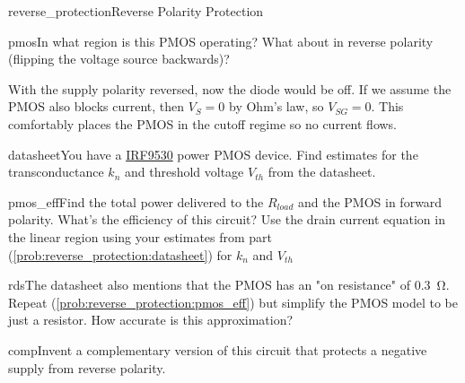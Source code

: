 \begin{mainquestion}{reverse_protection}{Reverse Polarity Protection}
\begin{partquestion}{pmos}{In what region is this PMOS operating? What about in reverse polarity (flipping the voltage source backwards)?}
\begin{answer}
    With the supply polarity reversed, now the diode would be off. If we assume the PMOS also blocks current, then $V_{S} = 0$ by Ohm's law, so $V_{SG} = 0$. This comfortably places the PMOS in the cutoff regime so no current flows.
\end{answer}
\end{partquestion}

\begin{partquestion}{datasheet}{You have a \href{https://www.vishay.com/docs/91076/91076.pdf}{IRF9530} power PMOS device. Find estimates for the transconductance $k_n$ and threshold voltage $V_{th}$ from the datasheet.}
\end{partquestion}

\begin{partquestion}{pmos_eff}{Find the total power delivered to the $R_{load}$ and the PMOS in forward polarity. What's the efficiency of this circuit? Use the drain current equation in the linear region using your estimates from part (\cref{prob:reverse_protection:datasheet}) for $k_n$ and $V_{th}$}
\end{partquestion}

\begin{partquestion}{rds}{The datasheet also mentions that the PMOS has an "on resistance" of \qty{0.3}{\ohm}. Repeat (\cref{prob:reverse_protection:pmos_eff}) but simplify the PMOS model to be just a resistor. How accurate is this approximation?}
\end{partquestion}

\begin{partquestion}{comp}{Invent a complementary version of this circuit that protects a negative supply from reverse polarity.}
\end{partquestion}

\end{mainquestion}
